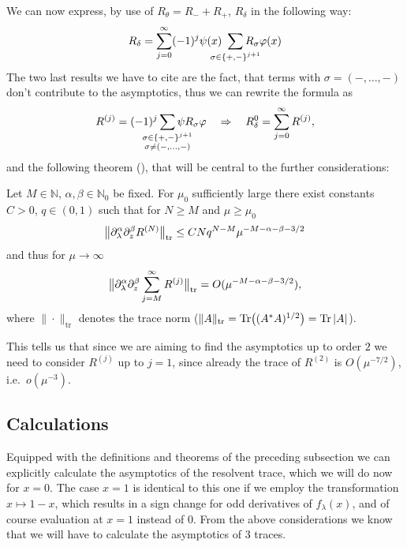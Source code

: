 We can now express, by use of $R_\theta = R_- + R_+$, $R_\delta$ in the
following way:
\begin{align}
  R_\delta = \sum_{j=0}^\infty (-1)^j \psi(x)
  \ \sum_{\mathclap{\sigma\in\{+,-\}^{j+1}}} R_\sigma \phi(x)
\end{align}
The two last results we have to cite are the fact, that terms with $\sigma =
(-,\ldots,-)$ don't contribute to the asymptotics, thus we can rewrite the
formula as
\begin{equation}
  R^{(j)} = (-1)^j \sum_{\mathclap{\substack{ \sigma\in\{+,-\}^{j+1} \\
  \sigma\neq(-,\ldots,-) }}} \psi R_\sigma \phi
  \quad \Rightarrow \quad R^0_\delta =
  \sum_{j=0}^\infty R^{(j)},
\end{equation}
and the following theorem (\cite[Prop.~2.2]{LV13}), that will be central to the
further considerations:
\begin{Theorem}
  \label{thm:r-expansion}
  Let $M\in\mathbb{N}$, $\alpha,\beta\in\mathbb{N}_0$ be fixed. For $\mu_0$
  sufficiently large there exist constants $C>0$, $q\in(0,1)$ such that for
  $N\geq M$ and $\mu \geq \mu_0$
  \begin{equation*}
    \Norm[\mathrm{tr}]{\partial_\lambda^\alpha\partial^\beta_z R^{(N)}}
    \leq CNq^{N-M}\mu^{-M-\alpha-\beta-3/2}
  \end{equation*}
  and thus for $\mu\to\infty$
  \begin{equation*}
    \Norm[\mathrm{tr}]{\partial^\alpha_\lambda\partial^\beta_z\sum_{j=M}^\infty
    R^{(j)}} = O(\mu^{-M-\alpha-\beta-3/2}),
  \end{equation*}
  where $\|\cdot\|_{\mathrm{tr}}$ denotes the trace norm
  ($\|A\|_\mathrm{tr} = \Tr\bigl((A^*A)^{1/2}\bigr) = \Tr\Abs{A}$).
\end{Theorem}
This tells us that since we are aiming to find the asymptotics up to order $2$
we need to consider $R^{(j)}$ up to $j=1$, since already the trace of $R^{(2)}$
is $O(\mu^{-7/2})$, i.e.\ $o(\mu^{-3})$.

\subsection{Calculations}
Equipped with the definitions and theorems of the preceding subsection we can
explicitly calculate the asymptotics of the resolvent trace, which we will do
now for $x=0$. The case $x=1$ is identical to this one if we employ the
transformation $x\mapsto 1-x$, which results in a sign change for odd
derivatives of $f_\lambda(x)$, and of course evaluation at $x=1$ instead of $0$.
From the above considerations we know that we will have to calculate the
asymptotics of $3$ traces.

